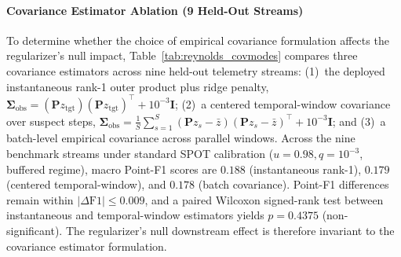 \paragraph{Covariance Estimator Ablation (9 Held-Out Streams)}
To determine whether the choice of empirical covariance formulation affects the regularizer's null impact, Table~\ref{tab:reynolds_covmodes} compares three covariance estimators across nine held-out telemetry streams: (1)~the deployed instantaneous rank-1 outer product plus ridge penalty, $\boldsymbol{\Sigma}_{\text{obs}} = (\mathbf{P} z_{\text{tgt}})(\mathbf{P} z_{\text{tgt}})^\top + 10^{-3}\mathbf{I}$; (2)~a centered temporal-window covariance over suspect steps, $\boldsymbol{\Sigma}_{\text{obs}} = \frac{1}{S}\sum_{s=1}^S (\mathbf{P} z_s - \bar{z})(\mathbf{P} z_s - \bar{z})^\top + 10^{-3}\mathbf{I}$; and (3)~a batch-level empirical covariance across parallel windows. Across the nine benchmark streams under standard SPOT calibration ($u=0.98, q=10^{-3}$, buffered regime), macro Point-F1 scores are $0.188$ (instantaneous rank-1), $0.179$ (centered temporal-window), and $0.178$ (batch covariance). Point-F1 differences remain within $|\Delta\mathrm{F1}| \le 0.009$, and a paired Wilcoxon signed-rank test between instantaneous and temporal-window estimators yields $p = 0.4375$ (non-significant). The regularizer's null downstream effect is therefore invariant to the covariance estimator formulation.

